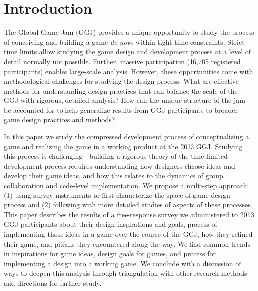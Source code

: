 \documentclass{sig-alternate}
\begin{document}
\section{Introduction}
The Global Game Jam (GGJ) provides a unique opportunity to study the process of conceiving and building a game \textit{de novo} within tight time constraints. Strict time limits allow studying the game design and development process at a level of detail normally not possible. Further, massive participation (16,705 registered participants) enables large-scale analysis.
However, these opportunities come with methodological challenges for studying the design process. What are effective methods for understanding design practices that can balance the scale of the GGJ with rigorous, detailed analysis? How can the unique structure of the jam be accounted for to help generalize results from GGJ participants to broader game design practices and methods?


In this paper we study the compressed development process of conceptualizing a game and realizing the game in a working product at the 2013 GGJ. Studying this process is challenging---building a rigorous theory of the time-limited development process requires understanding how designers choose ideas and develop their game ideas, and how this relates to the dynamics of group collaboration and code-level implementation. 
We propose a multi-step approach: 
(1) using survey instruments to first characterize the space of game design process and 
(2) following with more detailed studies of aspects of these processes.
This paper describes the results of a free-response survey we administered to 2013 GGJ participants about their design inspirations and goals, process of implementing those ideas in a game over the course of the GGJ, how they refined their game, and pitfalls they encountered along the way. 
We find common trends in inspirations for game ideas, design goals for games, and process for implementing a design into a working game.
We conclude with a discussion of ways to deepen this analysis through triangulation with other research methods and directions for further study.


\end{document}
